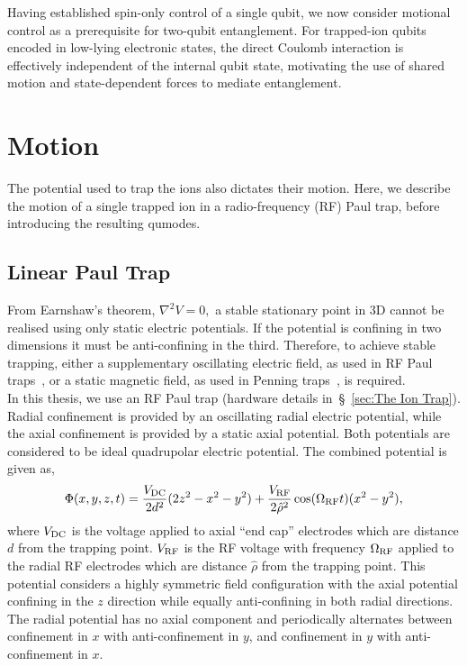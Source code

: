 Having established spin-only control of a single qubit, we now consider motional control as a prerequisite for two-qubit entanglement. For trapped-ion qubits encoded in low-lying electronic states, the direct Coulomb interaction is effectively independent of the internal qubit state, motivating the use of shared motion and state-dependent forces to mediate entanglement. 


\section{Motion}
The potential used to trap the ions also dictates their motion. 
Here, we describe the motion of a single trapped ion in a radio-frequency (RF) Paul trap, before introducing the resulting qumodes.

\subsection{Linear Paul Trap}
\label{sec:trap_charge}

From Earnshaw's theorem,
$\nabla^2 V = 0,$ a stable stationary point in 3D cannot be realised
using only static electric potentials. If the potential is confining
in two dimensions it must be anti-confining in the third. Therefore, to
achieve stable trapping, either a supplementary oscillating electric field, as used in RF Paul
traps~\cite{paul_electromagnetic_1990}, or a static magnetic field, as used in Penning
traps~\cite{dehmelt_experiments_1990}, is required.\\

In this thesis, we use an RF Paul trap (hardware details in~\S~\ref{sec:The Ion
Trap}). Radial confinement is provided by an oscillating radial electric
potential, while the axial confinement is provided by a static axial potential.
Both potentials are considered to be ideal quadrupolar electric potential. The combined potential is given as,
\begin{equation}
    \label{eqn:potential}
    \Phi(x,y,z,t) = \frac{V_{\rm DC}}{2d^2}(2z^2-x^2-y^2)+\frac{V_{\rm RF}}{2\hat\rho^2}\cos(\Omega_{\rm RF}t)(x^2-y^2),
\end{equation}
where $V_{\rm DC}$ is the voltage applied to axial ``end cap'' electrodes which are distance $d$ from the trapping point. $V_{\rm RF}$ is the RF voltage with frequency $\Omega_{\rm RF}$ applied to the radial RF electrodes which are distance $\hat\rho$ from the trapping point. This potential considers a highly symmetric field configuration with the axial potential confining in the $z$ direction while equally anti-confining in both radial directions.
The radial potential has no axial component and periodically alternates between confinement in $x$ with anti-confinement in $y$, and confinement in $y$ with anti-confinement in $x$.

